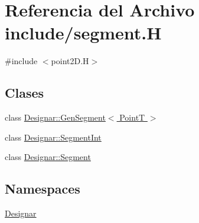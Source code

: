 \hypertarget{segment_8_h}{}\section{Referencia del Archivo include/segment.H}
\label{segment_8_h}
{\ttfamily \#include $<$point2\+D.\+H$>$}\newline
\subsection*{Clases}
\begin{DoxyCompactItemize}
\item 
class \hyperlink{class_designar_1_1_gen_segment}{Designar\+::\+Gen\+Segment$<$ Point\+T $>$}
\item 
class \hyperlink{class_designar_1_1_segment_int}{Designar\+::\+Segment\+Int}
\item 
class \hyperlink{class_designar_1_1_segment}{Designar\+::\+Segment}
\end{DoxyCompactItemize}
\subsection*{Namespaces}
\begin{DoxyCompactItemize}
\item 
 \hyperlink{namespace_designar}{Designar}
\end{DoxyCompactItemize}
